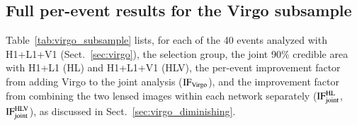 \documentclass{aa}
\begin{document}
\begin{appendix}







\onecolumn
\section{Full per-event results for the Virgo subsample}
\label{app:virgo_table}

Table~\ref{tab:virgo_subsample} lists, for each of the 40 events analyzed
with H1+L1+V1 (Sect.~\ref{sec:virgo}), the selection group, the joint 90\%
credible area with H1+L1 (HL) and H1+L1+V1 (HLV), the per-event improvement
factor from adding Virgo to the joint analysis ($\mathrm{IF}_{\rm Virgo}$),
and the improvement factor from combining the two lensed images within each
network separately ($\mathrm{IF}_{\rm joint}^{\rm HL}$,
$\mathrm{IF}_{\rm joint}^{\rm HLV}$), as discussed in
Sect.~\ref{sec:virgo_diminishing}.




\end{appendix}
\end{document}
